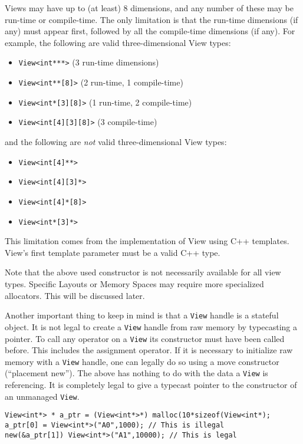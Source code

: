 Views may have up to (at least) 8 dimensions, and any number of these
may be run-time or compile-time.  The only limitation is that the
run-time dimensions (if any) must appear first, followed by all the
compile-time dimensions (if any).  For example, the following are
valid three-dimensional View types:
\begin{itemize}
\item \lstinline!View<int***>!  (3 run-time dimensions)
\item \lstinline!View<int**[8]>!  (2 run-time, 1 compile-time)
\item \lstinline!View<int*[3][8]>!  (1 run-time, 2 compile-time)
\item \lstinline!View<int[4][3][8]>!  (3 compile-time)
\end{itemize}
and the following are \emph{not} valid three-dimensional View types:
\begin{itemize}
\item \lstinline!View<int[4]**>!
\item \lstinline!View<int[4][3]*>!
\item \lstinline!View<int[4]*[8]>!
\item \lstinline!View<int*[3]*>!
\end{itemize}
This limitation comes from the implementation of View using C++
templates.  View's first template parameter must be a valid C++ type.

Note that the above used constructor is not necessarily available
for all view types. Specific Layouts or Memory Spaces may require more 
specialized allocators. This will be discussed later.

Another important thing to keep in mind is that a \lstinline|View| handle is a 
stateful object. It is not legal to create a \lstinline|View| handle from
raw memory by typecasting a pointer. To call any operator on a \lstinline|View|
its constructor must have been called before. This includes the assignment
operator. If it is necessary to initialize raw memory with a \lstinline|View| 
handle, one can legally do so using a move constructor (``placement new'').
The above has nothing to do with the data a \lstinline|View| is referencing.
It is completely legal to give a typecast pointer to the constructor of an
unmanaged \lstinline|View|.

\begin{lstlisting}
View<int*> * a_ptr = (View<int*>*) malloc(10*sizeof(View<int*);
a_ptr[0] = View<int*>("A0",1000); // This is illegal
new(&a_ptr[1]) View<int*>("A1",10000); // This is legal 
\end{lstlisting}


